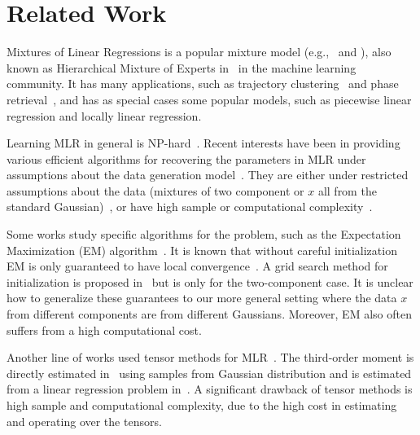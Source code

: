 \section{Related Work} \label{sec:related}


Mixtures of Linear Regressions is a popular mixture model (e.g.,~\citep{de1989mixtures,grun2007applications} and \citep{faria2010fitting}), also known as Hierarchical Mixture of Experts in~\citep{jordan1994hierarchical} in the machine learning community. 
It has many applications, such as trajectory clustering~\citep{gaffney1999trajectory} and phase retrieval~\citep{balakrishnan2017statistical}, and has as special cases some popular models, such as piecewise linear regression and locally linear regression.

Learning MLR in general is NP-hard~\citep{yi2014alternating}. Recent interests have been in providing various efficient algorithms for recovering the parameters in MLR under assumptions about the data generation model~\citep{chaganty2013spectral,chen2014convex,yi2014alternating,zhong2016mixed,klusowski2017estimating}. 
They are either under restricted assumptions about the data (mixtures of two component or $x$ all from the standard Gaussian)~\citep{chen2014convex,yi2014alternating,balakrishnan2017statistical,klusowski2017estimating}, or have high sample or computational complexity~\citep{chaganty2013spectral,sedghi2016provable}. 

Some works study specific algorithms for the problem, such as  the Expectation Maximization (EM) algorithm~\citep{khalili2007variable,yi2014alternating,balakrishnan2017statistical,klusowski2017estimating}. It is known that without careful initialization EM is only guaranteed to have local convergence~\citep{klusowski2017estimating}. A grid search method for initialization is proposed in~\citep{yi2014alternating} but is only for the two-component case. It is unclear how to generalize these guarantees to our more general setting where the data $x$ from different components are from different Gaussians.
Moreover, EM also often suffers from a high computational cost.

Another line of works used tensor methods for MLR~\citep{chaganty2013spectral,sedghi2016provable}. The third-order moment is directly estimated in~\citep{chaganty2013spectral} using samples from Gaussian distribution and is estimated from a linear regression problem in~\citep{sedghi2016provable}. A significant drawback of tensor methods is high sample and computational complexity, due to the high cost in estimating and operating over the tensors. 

